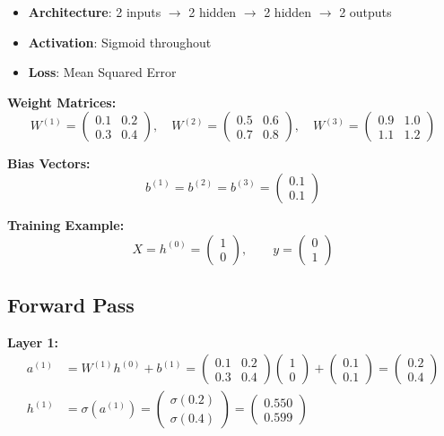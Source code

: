 \begin{itemize}
    \item \textbf{Architecture}: 2 inputs $\to$ 2 hidden $\to$ 2 hidden $\to$ 2 outputs
    \item \textbf{Activation}: Sigmoid throughout
    \item \textbf{Loss}: Mean Squared Error
\end{itemize}

\textbf{Weight Matrices:}
\[
W^{(1)} = \begin{pmatrix} 0.1 & 0.2 \\ 0.3 & 0.4 \end{pmatrix}, \quad
W^{(2)} = \begin{pmatrix} 0.5 & 0.6 \\ 0.7 & 0.8 \end{pmatrix}, \quad
W^{(3)} = \begin{pmatrix} 0.9 & 1.0 \\ 1.1 & 1.2 \end{pmatrix}
\]

\textbf{Bias Vectors:}
\[
b^{(1)} = b^{(2)} = b^{(3)} = \begin{pmatrix} 0.1 \\ 0.1 \end{pmatrix}
\]

\textbf{Training Example:}
\[
X = h^{(0)} = \begin{pmatrix} 1 \\ 0 \end{pmatrix}, \qquad y = \begin{pmatrix} 0 \\ 1 \end{pmatrix}
\]

\subsection{Forward Pass}

\textbf{Layer 1:}
\begin{align}
a^{(1)} &= W^{(1)} h^{(0)} + b^{(1)} = \begin{pmatrix} 0.1 & 0.2 \\ 0.3 & 0.4 \end{pmatrix} \begin{pmatrix} 1 \\ 0 \end{pmatrix} + \begin{pmatrix} 0.1 \\ 0.1 \end{pmatrix} = \begin{pmatrix} 0.2 \\ 0.4 \end{pmatrix} \\
h^{(1)} &= \sigma(a^{(1)}) = \begin{pmatrix} \sigma(0.2) \\ \sigma(0.4) \end{pmatrix} = \begin{pmatrix} 0.550 \\ 0.599 \end{pmatrix}
\end{align}

